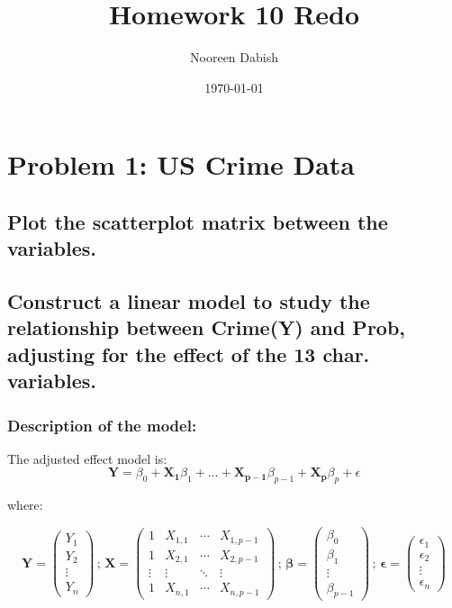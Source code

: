 \documentclass[11pt]{article}
\title{Homework 10 Redo}
\author{Nooreen Dabish}
\date{\today}
\begin{document}
\maketitle

\section{Problem 1: US Crime Data}
\label{sec-1}
\subsection{Plot the scatterplot matrix between the variables.}
\label{sec-1-1}
\subsection{Construct a linear model to study the relationship between Crime(Y) and Prob, adjusting for the effect of the 13 char. variables.}
\label{sec-1-2}
\subsubsection{Description of the model:}
\label{sec-1-2-1}


The adjusted effect model is:
$$\mathbf{Y} = \beta_0 + \mathbf{X_1}\beta_1+\ldots+\mathbf{X_{p-1}}\beta_{p-1}+\mathbf{X_p}\beta_p+\epsilon$$

where:

\begin{equation*}
   \mathbf{Y} = 
   \begin{pmatrix}
    Y_1\\
    Y_2\\
    \vdots\\
     Y_n
  \end{pmatrix}\, ; \,
  \mathbf{X} =
  \begin{pmatrix}
    1      & X_{1,1} & \cdots & X_{1,p-1}\\
    1      & X_{2,1} & \cdots & X_{2,p-1}\\
    \vdots & \vdots  & \ddots  & \vdots \\
    1      & X_{n,1} & \cdots & X_{n,p-1}
  \end{pmatrix} \, ; \,
   \mathbf{\beta} = 
   \begin{pmatrix}
    \beta_0\\
    \beta_1\\
    \vdots\\
     \beta_{p-1}
  \end{pmatrix}\, ; \,
   \mathbf{\epsilon} = 
   \begin{pmatrix}
    \epsilon_1\\
    \epsilon_2\\
    \vdots\\
    \epsilon_n
  \end{pmatrix}
  \end{equation*}
\end{document}
